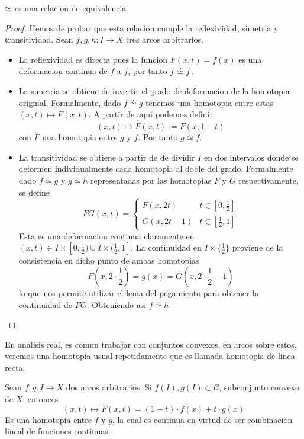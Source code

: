 \begin{teorema}
  \(\stackrel{.}{\simeq}\) es una relacion de equivalencia
\end{teorema}
\begin{proof}
  Hemos de probar que esta relacion cumple la reflexividad, simetria y
  transitividad. Sean \(f,g,h : I \to X\) tres arcos arbitrarios.
  \begin{itemize}
  \item La reflexividad es directa pues la funcion \(F(x,t) = f(x)\) es
    una deformacion continua de \(f\) a \(f\), por tanto \(f \stackrel{.}{\simeq}
    f\).

  \item La simetria se obtiene de invertir el grado de deformacion de la
    homotopia original. Formalmente, dado \(f \stackrel{.}{\simeq} g\)
    tenemos una homotopia entre estas \((x,t) \mapsto F(x,t)\). A partir
    de aqui podemos definir
    \begin{equation}
      \label{eq:homotopy-simetry}
      (x,t) \mapsto \hat{F}(x,t) := F(x,1-t)
    \end{equation}
    con \(\hat{F}\) una homotopia entre \(g\) y \(f\). Por tanto \(g
    \stackrel{.}{\simeq} f\).


  \item La transitividad se obtiene a partir de de dividir \(I\) en dos
    intervalos donde se deformen individualmente cada homotopia al doble
    del grado. Formalmente dado \(f \stackrel{.}{\simeq} g\) y \(g
    \stackrel{.}{\simeq} h\) representadas por las homotopias \(F\) y
    \(G\) respectivamente, se define
    \[ FG(x,t) = \begin{cases}
        F(x,2t) & t \in [0,\frac{1}{2}] \\
        G(x,2t - 1) & t \in [ \frac{1}{2} , 1]
      \end{cases}
    \]
    Esta es una deformacion continua claramente en \((x,t) \in I \times
    [0, \frac{1}{2}) \cup I \times (\frac{1}{2}, 1]\). La continuidad en
    \(I \times \{\frac{1}{2}\}\) proviene de la consistencia en dicho
    punto de ambas homotopias
    \[ F(x,2 \cdot \frac{1}{2}) = g(x) = G(x, 2 \cdot \frac{1}{2} - 1)\]
    lo que nos permite utilizar el lema del pegamiento para obtener la
    continuidad de \(FG\). Obteniendo asi \(f \stackrel{.}{\simeq} h\).
  \end{itemize}
\end{proof}

En analisis real, es comun trabajar con conjuntos convexos, en arcos
sobre estos, veremos una homotopia usual repetidamente que es llamada
homotopia de linea recta.
\begin{definicion}\label{def:homotopia-linea}
  Sean \(f,g : I \to X\) dos arcos arbitrarios. Si \(f(I),g(I) \subset
  \mathcal C\), subconjunto convexo de \(X\), entonces
  \[ (x,t) \mapsto F(x,t) = (1-t) \cdot f(x) + t \cdot g(x) \]
  Es una homotopia entre \(f\) y \(g\), la cual es continua en virtud de
  ser combinacion lineal de funciones continuas.
\end{definicion}

